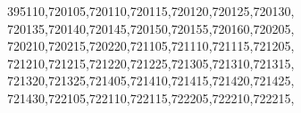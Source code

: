 \documentclass[
  12,
  dvipsnames]{article}
\newenvironment{Shaded}{\begin{snugshade}}{\end{snugshade}}
\newcommand{\NormalTok}[1]{#1}
\newcommand{\StringTok}[1]{\textcolor[rgb]{0.31,0.60,0.02}{#1}}
\begin{document}
\begin{Shaded}
\begin{Highlighting}[]
                  \StringTok{\textquotesingle{}395110\textquotesingle{}}\NormalTok{,}\StringTok{\textquotesingle{}720105\textquotesingle{}}\NormalTok{,}\StringTok{\textquotesingle{}720110\textquotesingle{}}\NormalTok{,}\StringTok{\textquotesingle{}720115\textquotesingle{}}\NormalTok{,}\StringTok{\textquotesingle{}720120\textquotesingle{}}\NormalTok{,}\StringTok{\textquotesingle{}720125\textquotesingle{}}\NormalTok{,}\StringTok{\textquotesingle{}720130\textquotesingle{}}\NormalTok{,}
                  \StringTok{\textquotesingle{}720135\textquotesingle{}}\NormalTok{,}\StringTok{\textquotesingle{}720140\textquotesingle{}}\NormalTok{,}\StringTok{\textquotesingle{}720145\textquotesingle{}}\NormalTok{,}\StringTok{\textquotesingle{}720150\textquotesingle{}}\NormalTok{,}\StringTok{\textquotesingle{}720155\textquotesingle{}}\NormalTok{,}\StringTok{\textquotesingle{}720160\textquotesingle{}}\NormalTok{,}\StringTok{\textquotesingle{}720205\textquotesingle{}}\NormalTok{,}
                  \StringTok{\textquotesingle{}720210\textquotesingle{}}\NormalTok{,}\StringTok{\textquotesingle{}720215\textquotesingle{}}\NormalTok{,}\StringTok{\textquotesingle{}720220\textquotesingle{}}\NormalTok{,}\StringTok{\textquotesingle{}721105\textquotesingle{}}\NormalTok{,}\StringTok{\textquotesingle{}721110\textquotesingle{}}\NormalTok{,}\StringTok{\textquotesingle{}721115\textquotesingle{}}\NormalTok{,}\StringTok{\textquotesingle{}721205\textquotesingle{}}\NormalTok{,}
                  \StringTok{\textquotesingle{}721210\textquotesingle{}}\NormalTok{,}\StringTok{\textquotesingle{}721215\textquotesingle{}}\NormalTok{,}\StringTok{\textquotesingle{}721220\textquotesingle{}}\NormalTok{,}\StringTok{\textquotesingle{}721225\textquotesingle{}}\NormalTok{,}\StringTok{\textquotesingle{}721305\textquotesingle{}}\NormalTok{,}\StringTok{\textquotesingle{}721310\textquotesingle{}}\NormalTok{,}\StringTok{\textquotesingle{}721315\textquotesingle{}}\NormalTok{,}
                  \StringTok{\textquotesingle{}721320\textquotesingle{}}\NormalTok{,}\StringTok{\textquotesingle{}721325\textquotesingle{}}\NormalTok{,}\StringTok{\textquotesingle{}721405\textquotesingle{}}\NormalTok{,}\StringTok{\textquotesingle{}721410\textquotesingle{}}\NormalTok{,}\StringTok{\textquotesingle{}721415\textquotesingle{}}\NormalTok{,}\StringTok{\textquotesingle{}721420\textquotesingle{}}\NormalTok{,}\StringTok{\textquotesingle{}721425\textquotesingle{}}\NormalTok{,}
                  \StringTok{\textquotesingle{}721430\textquotesingle{}}\NormalTok{,}\StringTok{\textquotesingle{}722105\textquotesingle{}}\NormalTok{,}\StringTok{\textquotesingle{}722110\textquotesingle{}}\NormalTok{,}\StringTok{\textquotesingle{}722115\textquotesingle{}}\NormalTok{,}\StringTok{\textquotesingle{}722205\textquotesingle{}}\NormalTok{,}\StringTok{\textquotesingle{}722210\textquotesingle{}}\NormalTok{,}\StringTok{\textquotesingle{}722215\textquotesingle{}}\NormalTok{,}

\end{Highlighting}
\end{Shaded}
\end{document}
